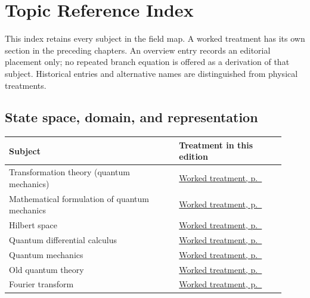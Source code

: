 \documentclass[11pt,oneside]{book}
\begin{document}
\chapter{Topic Reference Index}
This index retains every subject in the field map. A worked treatment has its own section in the preceding chapters. An overview entry records an editorial placement only; no repeated branch equation is offered as a derivation of that subject. Historical entries and alternative names are distinguished from physical treatments.
\section*{State space, domain, and representation}
\begin{longtable}{p{0.57\linewidth}p{0.35\linewidth}}
\toprule Subject & Treatment in this edition \\
\midrule\endhead
{}\label{index:transformation-theory-quantum-mechanics}Transformation theory (quantum mechanics) & \hyperref[topic:transformation-theory-quantum-mechanics]{Worked treatment, p.~\pageref*{topic:transformation-theory-quantum-mechanics}} \\
\label{index:mathematical-formulation-of-quantum-mechanics}Mathematical formulation of quantum mechanics & \hyperref[topic:mathematical-formulation-of-quantum-mechanics]{Worked treatment, p.~\pageref*{topic:mathematical-formulation-of-quantum-mechanics}} \\
\label{index:hilbert-space}Hilbert space & \hyperref[topic:hilbert-space]{Worked treatment, p.~\pageref*{topic:hilbert-space}} \\
\label{index:quantum-differential-calculus}Quantum differential calculus & \hyperref[topic:quantum-differential-calculus]{Worked treatment, p.~\pageref*{topic:quantum-differential-calculus}} \\
\label{index:quantum-mechanics}Quantum mechanics & \hyperref[topic:quantum-mechanics]{Worked treatment, p.~\pageref*{topic:quantum-mechanics}} \\
\label{index:old-quantum-theory}Old quantum theory & \hyperref[topic:old-quantum-theory]{Worked treatment, p.~\pageref*{topic:old-quantum-theory}} \\
\label{index:fourier-transform}Fourier transform & \hyperref[topic:fourier-transform]{Worked treatment, p.~\pageref*{topic:fourier-transform}} \\
\bottomrule
\end{longtable}
\end{document}
